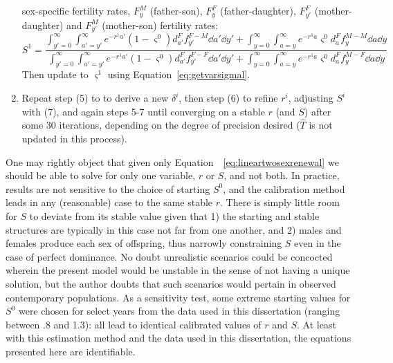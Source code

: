 \begin{enumerate}
  sex-specific fertility rates, $F_y^M$ (father-son), $F_y^F$
  (father-daughter), $F_{y'}^F$ (mother-daughter) and $F_{y'}^M$ (mother-son)
  fertility rates:
  \begin{equation}
  S^1 = \frac{ \int _{y'=0}^\infty \int _{a'=y'}^\infty e^{-r^1a'}
                      (1-\varsigma^0)d_{a'}^F f_{y'}^{F-M} \dd a' \dd y' + \int
                      _{y=0}^\infty \int _{a=y}^\infty e^{-r^1a}
                      \varsigma^0 d_{a}^F f_{y}^{M-M} \dd a \dd y}{\int
                      _{y'=0}^\infty \int _{a'=y'}^\infty e^{-r^1a'}
                      (1-\varsigma^0)d_{a'}^F f_{y'}^{F-F} \dd a' \dd y' + \int
                      _{y=0}^\infty \int _{a=y}^\infty e^{-r^1a} \varsigma^0
                      d_{a}^F f_{y}^{M-F} \dd a \dd y}
  \end{equation}
  Then update to $\varsigma^1$ using Equation~\eqref{eq:getvarsigmal}.
  \item Repeat step (5) to to derive a new $\delta^i$, then step (6) to refine
  $r^i$, adjusting $S^i$ with (7), and again steps 5-7 until converging on a
  stable $r$ (and $S$) after some 30 iterations, depending on the degree of
  precision desired ($\widehat{T}$ is not updated in this process).
\end{enumerate}
  One may rightly object that given only
  Equation~~\eqref{eq:lineartwosexrenewal} we should be able to
  solve for only one variable, $r$ or $S$, and not both. In practice, results
  are not sensitive to the choice of starting $S^0$, and the
  calibration method leads in any (reasonable) case to the same stable $r$.
  There is simply little room for $S$ to deviate from its stable value given
  that 1) the starting and stable structures are typically in this
  case not far from one another, and 2) males and females produce each sex of
  offspring, thus narrowly constraining $S$ even in the case of
  perfect dominance. No doubt unrealistic scenarios could be concocted wherein
  the present model would be unstable in the sense of not having a unique 
  solution, but the author doubts that
  such scenarios would pertain in observed contemporary populations. As a
  sensitivity test, some extreme starting values for $S^0$ were chosen for
  select years from the data used in this dissertation (ranging between .8 and
  1.3): all lead to identical calibrated values of $r$ and $S$. At least with
  this estimation method and the data used in this dissertation, the equations
  presented here are identifiable.
